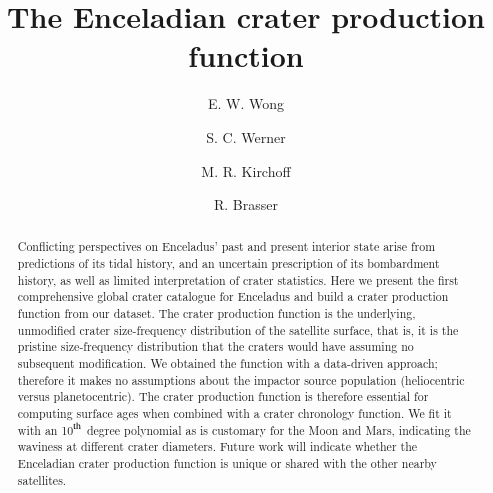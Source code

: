 \documentclass[preprint,12pt,3p,times,authoryear]{elsarticle}
\begin{document}
\begin{frontmatter}

\title{The Enceladian crater production function}

\author[UniGe,ELSI]{E. W. Wong}
\author[UiO]{S. C. Werner}
\author[SW]{M. R. Kirchoff}
\author[CSFK,UiO]{R. Brasser}







%
\linenumbers
\begin{abstract}
Conflicting perspectives on Enceladus' past and present interior state arise from predictions of its tidal history, and an uncertain prescription of its bombardment history, as well as limited interpretation of crater statistics. Here we present the first comprehensive global crater catalogue for Enceladus and build a crater production function from our dataset. The crater production function is the underlying, unmodified crater size-frequency distribution of the satellite surface, that is, it is the pristine size-frequency distribution that the craters would have assuming no subsequent modification. We obtained the function with a data-driven approach;  therefore it makes no assumptions about the impactor source population (heliocentric versus planetocentric). The crater production function is therefore essential for computing surface ages when combined with a crater chronology function. We fit it with an 10$^{\rm th}$ degree polynomial as is customary for the Moon and Mars, indicating the waviness at different crater diameters. Future work will indicate whether the Enceladian crater production function is unique or shared with the other nearby satellites.
\end{abstract}


\end{frontmatter}
\end{document}
